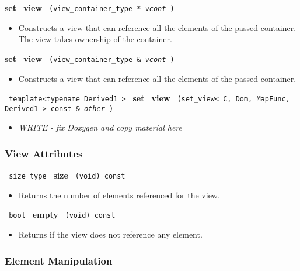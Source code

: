 \noindent
\textbf{set\_view}%
\texttt{%
(view\_container\_type *
\textit{vcont}%
)
}

\begin{itemize}
\item
Constructs a view that can reference all the elements of the passed container. The view takes ownership of the container.
\end{itemize}

\noindent
\textbf{set\_view}%
\texttt{%
(view\_container\_type \&
\textit{vcont}%
)
}

\begin{itemize}
\item
Constructs a view that can reference all the elements of the passed container.
\end{itemize}

\noindent
\texttt{%
template<typename Derived1 >
}
\newline
\textbf{set\_view}%
\texttt{%
(set\_view< C, Dom, MapFunc, Derived1 > const \&
\textit{other}%
)
}

\begin{itemize}
\item
\textit{WRITE - fix Doxygen and copy material here}
\end{itemize}

\subsubsection{ View Attributes}

\noindent
\texttt{%
size\_type
}
\newline
\textbf{size}%
\texttt{%
(void) const
}

\begin{itemize}
\item
Returns the number of elements referenced for the view.
\end{itemize}

\noindent
\texttt{%
bool
}
\newline
\textbf{empty}%
\texttt{%
(void) const
}

\begin{itemize}
\item
Returns if the view does not reference any element.
\end{itemize}


\subsubsection{ Element Manipulation}

